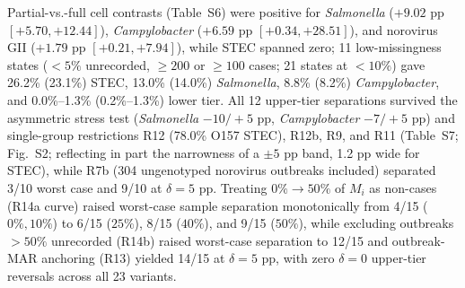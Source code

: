 Partial-vs.-full cell contrasts (Table~S6) were positive for \textit{Salmonella} ($+9.02\text{ pp}$ $[+5.70, +12.44]$), \textit{Campylobacter} ($+6.59\text{ pp}$ $[+0.34, +28.51]$), and norovirus GII ($+1.79\text{ pp}$ $[+0.21, +7.94]$), while STEC spanned zero; 11 low-missingness states ($<5\%$ unrecorded, $\ge 200$ or $\ge 100$ cases; 21 states at $<10\%$) gave 26.2\% (23.1\%) STEC, 13.0\% (14.0\%) \textit{Salmonella}, 8.8\% (8.2\%) \textit{Campylobacter}, and 0.0\%--1.3\% (0.2\%--1.3\%) lower tier. All 12 upper-tier separations survived the asymmetric stress test (\textit{Salmonella} $-10/+5\text{ pp}$, \textit{Campylobacter} $-7/+5\text{ pp}$) and single-group restrictions R12 (78.0\% O157 STEC), R12b, R9, and R11 (Table~S7; Fig.~S2; reflecting in part the narrowness of a $\pm 5\text{ pp}$ band, 1.2 pp wide for STEC), while R7b (304 ungenotyped norovirus outbreaks included) separated 3/10 worst case and 9/10 at $\delta = 5\text{ pp}$. Treating $0\% \to 50\%$ of $M_i$ as non-cases (R14a curve) raised worst-case sample separation monotonically from 4/15 ($0\%, 10\%$) to 6/15 ($25\%$), 8/15 ($40\%$), and 9/15 ($50\%$), while excluding outbreaks $>50\%$ unrecorded (R14b) raised worst-case separation to 12/15 and outbreak-MAR anchoring (R13) yielded 14/15 at $\delta=5\text{ pp}$, with zero $\delta=0$ upper-tier reversals across all 23 variants.


